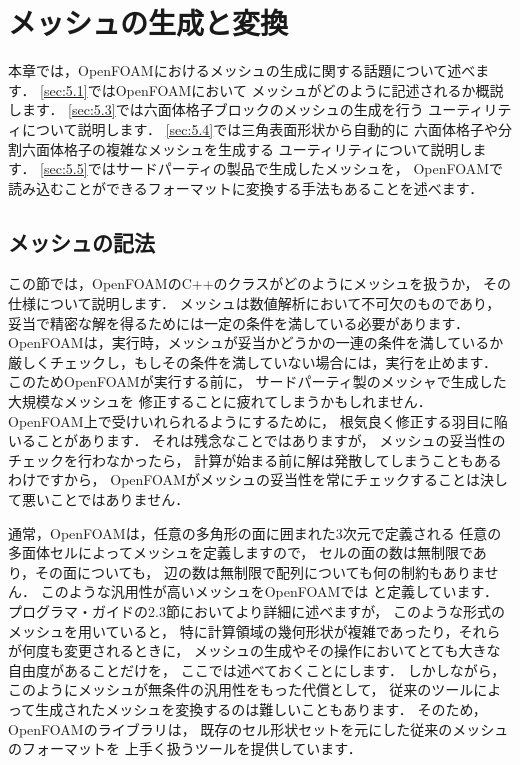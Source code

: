 \chapter{メッシュの生成と変換}
\label{chap:5}
本章では，OpenFOAMにおけるメッシュの生成に関する話題について述べます．
\autoref{sec:5.1}ではOpenFOAMにおいて
メッシュがどのように記述されるか概説します．
\autoref{sec:5.3}では六面体格子ブロックのメッシュの生成を行う
ユーティリティについて説明します．
\autoref{sec:5.4}では三角表面形状から自動的に
六面体格子や分割六面体格子の複雑なメッシュを生成する
ユーティリティについて説明します．
\autoref{sec:5.5}ではサードパーティの製品で生成したメッシュを，
OpenFOAMで読み込むことができるフォーマットに変換する手法もあることを述べます．



\section{メッシュの記法}
\label{sec:5.1}
%
この節では，OpenFOAMのC++のクラスがどのようにメッシュを扱うか，
その仕様について説明します．
メッシュは数値解析において不可欠のものであり，
妥当で精密な解を得るためには一定の条件を満している必要があります．
OpenFOAMは，実行時，メッシュが妥当かどうかの一連の条件を満しているか
厳しくチェックし，もしその条件を満していない場合には，実行を止めます．
このためOpenFOAMが実行する前に，
サードパーティ製のメッシャで生成した大規模なメッシュを
修正することに疲れてしまうかもしれません．
OpenFOAM上で受けいれられるようにするために，
根気良く修正する羽目に陥いることがあります．
それは残念なことではありますが，
メッシュの妥当性のチェックを行わなかったら，
計算が始まる前に解は発散してしまうこともあるわけですから，
OpenFOAMがメッシュの妥当性を常にチェックすることは決して悪いことではありません．

通常，OpenFOAMは，任意の多角形の面に囲まれた3次元で定義される
任意の多面体セルによってメッシュを定義しますので，
セルの面の数は無制限であり，その面についても，
辺の数は無制限で配列についても何の制約もありません．
このような汎用性が高いメッシュをOpenFOAMでは
%
%
と定義しています．
プログラマ・ガイドの2.3節においてより詳細に述べますが，
このような形式のメッシュを用いていると，
特に計算領域の幾何形状が複雑であったり，それらが何度も変更されるときに，
メッシュの生成やその操作においてとても大きな自由度があることだけを，
ここでは述べておくことにします．
しかしながら，このようにメッシュが無条件の汎用性をもった代償として，
従来のツールによって生成されたメッシュを変換するのは難しいこともあります．
そのため，OpenFOAMのライブラリは，
既存のセル形状セットを元にした従来のメッシュのフォーマットを
上手く扱うツールを提供しています．


